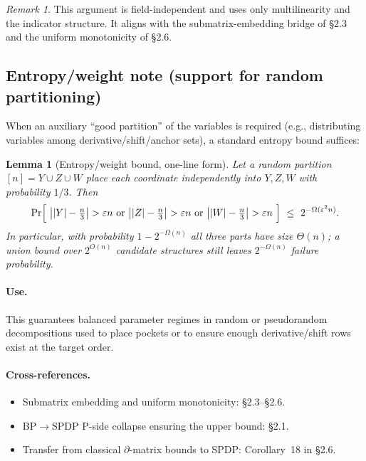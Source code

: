 \documentclass[12pt]{article}
\newtheorem{lemma}[theorem]{Lemma}
\theoremstyle{definition}
\theoremstyle{definition}
\theoremstyle{remark}
\newtheorem{remark}{Remark}
\theoremstyle{remark}
\begin{document}
\begin{remark}
This argument is field-independent and uses only multilinearity and the indicator structure. It aligns with the submatrix-embedding bridge of \S2.3 and the uniform monotonicity of \S2.6.
\end{remark}

\subsection{Entropy/weight note (support for random partitioning)}

When an auxiliary ``good partition'' of the variables is required (e.g., distributing variables among derivative/shift/anchor sets), a standard entropy bound suffices:

\begin{lemma}[Entropy/weight bound, one-line form]\label{lem:entropy-weight}
Let a random partition $[n]=Y\cup Z\cup W$ place each coordinate independently into $Y,Z,W$ with probability $1/3$. Then
\[
\Pr\Bigl[\ \bigl||Y|-\tfrac{n}{3}\bigr|>\varepsilon n\text{ or }\bigl||Z|-\tfrac{n}{3}\bigr|>\varepsilon n\text{ or }\bigl||W|-\tfrac{n}{3}\bigr|>\varepsilon n\ \Bigr]\ \le\ 2^{-\Omega(\varepsilon^2 n)}.
\]
In particular, with probability $1-2^{-\Omega(n)}$ all three parts have size $\Theta(n)$; a union bound over $2^{O(n)}$ candidate structures still leaves $2^{-\Omega(n)}$ failure probability.
\end{lemma}

\paragraph{Use.} This guarantees balanced parameter regimes in random or pseudorandom decompositions used to place pockets or to ensure enough derivative/shift rows exist at the target order.

\paragraph{Cross-references.}
\begin{itemize}
\item Submatrix embedding and uniform monotonicity: \S2.3--\S2.6.
\item BP$\to$SPDP P-side collapse ensuring the upper bound: \S2.1.
\item Transfer from classical $\partial$-matrix bounds to SPDP: Corollary~18 in \S2.6.
\end{itemize}
\end{document}
